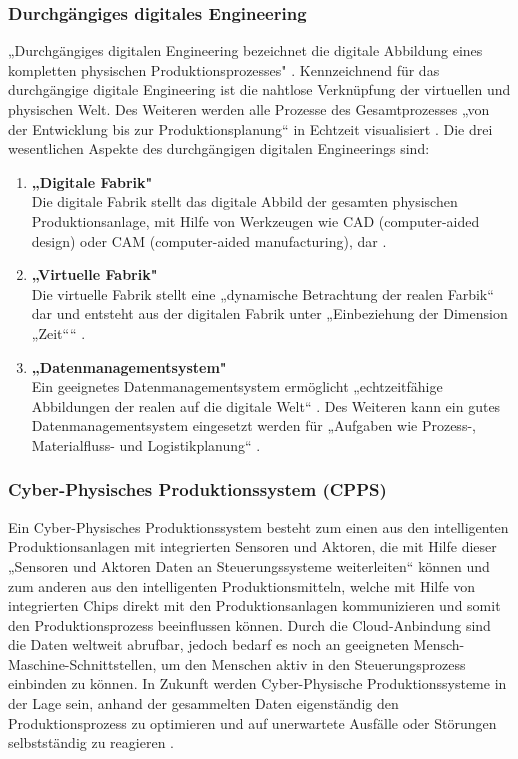 \subsubsection{Durchgängiges digitales Engineering}\label{sec:DigitalesEngineering}
„Durchgängiges digitalen Engineering bezeichnet die digitale Abbildung eines kompletten physischen Produktionsprozesses" \cite[S.41]{14}. Kennzeichnend für das durchgängige digitale Engineering ist die nahtlose Verknüpfung der virtuellen und physischen Welt. Des Weiteren werden alle Prozesse des Gesamtprozesses „von der Entwicklung bis zur Produktionsplanung“ \cite[S.41]{14} in Echtzeit visualisiert \cite[S.41]{14}.
\newline
Die drei wesentlichen Aspekte des durchgängigen digitalen Engineerings sind:
\begin{enumerate}
	\item \textbf{„Digitale Fabrik"} \cite[S.41]{14} \\ 
	Die digitale Fabrik stellt das digitale Abbild der gesamten physischen Produktionsanlage, mit Hilfe von Werkzeugen wie CAD (computer-aided design) oder CAM (computer-aided manufacturing), dar \cite[S.41]{14}.
	\item \textbf{„Virtuelle Fabrik"} \cite[S.41]{14} \\
	Die virtuelle Fabrik stellt eine „dynamische Betrachtung der realen Farbik“ \cite[S.41]{14} dar und entsteht aus der digitalen Fabrik unter „Einbeziehung der Dimension „Zeit““ \cite[S.41]{14}.
	\item \textbf{„Datenmanagementsystem"} \cite[S.41]{14} \\
	Ein geeignetes Datenmanagementsystem ermöglicht „echtzeitfähige Abbildungen der realen auf die digitale Welt“ \cite[S.41]{14}. Des Weiteren kann ein gutes Datenmanagementsystem eingesetzt werden für „Aufgaben wie Prozess-, Materialfluss- und Logistikplanung“ \cite[S.41]{14}.
\end{enumerate}

\subsubsection{Cyber-Physisches Produktionssystem (CPPS)}\label{sec:CPPS}
Ein Cyber-Physisches Produktionssystem besteht zum einen aus den intelligenten Produktionsanlagen mit integrierten Sensoren und Aktoren, die mit Hilfe dieser „Sensoren und Aktoren Daten an Steuerungssysteme weiterleiten“ \cite[S.42]{14} können und zum anderen aus den intelligenten Produktionsmitteln, welche mit Hilfe von integrierten Chips direkt mit den Produktionsanlagen kommunizieren und somit den Produktionsprozess beeinflussen können. Durch die Cloud-Anbindung sind die Daten weltweit abrufbar, jedoch bedarf es noch an geeigneten Mensch-Maschine-Schnittstellen, um den Menschen aktiv in den Steuerungsprozess einbinden zu können. In Zukunft werden Cyber-Physische Produktionssysteme in der Lage sein, anhand der gesammelten Daten eigenständig den Produktionsprozess zu optimieren und auf unerwartete Ausfälle oder Störungen selbstständig zu reagieren \cite[S.42]{14}.
\newpage

